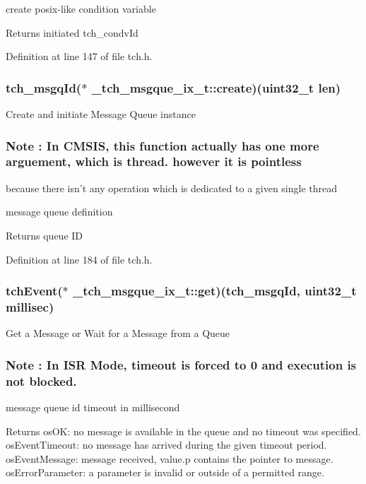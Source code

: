 create posix-\/like condition variable 

\begin{DoxyReturn}{Returns}
initiated tch\+\_\+condv\+Id 
\end{DoxyReturn}


Definition at line 147 of file tch.\+h.

\hypertarget{group___a_p_i_gacd7fbe11975c8e0b1a93fe399aed2ee0}{
\subsubsection[{create}]{\setlength{\rightskip}{0pt plus 5cm}tch\+\_\+msgq\+Id($\ast$ \+\_\+tch\+\_\+msgque\+\_\+ix\+\_\+t\+::create)(uint32\+\_\+t len)}}\label{group___a_p_i_gacd7fbe11975c8e0b1a93fe399aed2ee0}
Create and initiate Message Queue instance \subsubsection*{Note \+: In C\+M\+S\+I\+S, this function actually has one more arguement, which is thread. however it is pointless}

because there isn't any operation which is dedicated to a given single thread

message queue definition \begin{DoxyReturn}{Returns}
queue I\+D 
\end{DoxyReturn}


Definition at line 184 of file tch.\+h.

\hypertarget{group___a_p_i_gae5f29b1432e00abd819c419e351f6f0b}{
\subsubsection[{get}]{\setlength{\rightskip}{0pt plus 5cm}tch\+Event($\ast$ \+\_\+tch\+\_\+msgque\+\_\+ix\+\_\+t\+::get)(tch\+\_\+msgq\+Id, uint32\+\_\+t millisec)}}\label{group___a_p_i_gae5f29b1432e00abd819c419e351f6f0b}
Get a Message or Wait for a Message from a Queue \subsubsection*{Note \+: In I\+S\+R Mode, timeout is forced to 0 and execution is not blocked.}

message queue id  timeout in millisecond \begin{DoxyReturn}{Returns}
os\+O\+K\+: no message is available in the queue and no timeout was specified. os\+Event\+Timeout\+: no message has arrived during the given timeout period. os\+Event\+Message\+: message received, value.\+p contains the pointer to message. os\+Error\+Parameter\+: a parameter is invalid or outside of a permitted range. 
\end{DoxyReturn}


